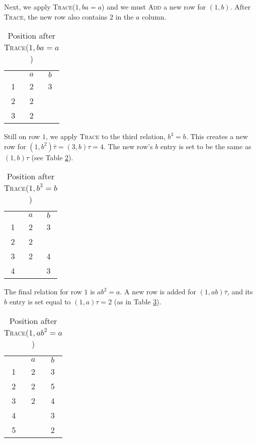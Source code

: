 Next, we apply \textsc{Trace}($1, ba=a$) and we must \textsc{Add} a new row for
$(1, b)$.  After \textsc{Trace}, the new row also contains $2$ in the $a$
column.
\begin{table}[H]
  \centering
  \begin{tabular}{c | c | c |}
    \multicolumn{1}{c}{} &
    \multicolumn{1}{c}{$a$} &
    \multicolumn{1}{c}{$b$} \\
    \cline{2-3}
    1 & 2 & 3 \\
    \cline{2-3}
    2 & 2 & \\
    \cline{2-3}
    3 & 2 & \\
    \cline{2-3}
  \end{tabular}
  \caption{Position after \textsc{Trace}($1, ba=a$)}
  \label{tab:tc3}
\end{table}

Still on row $1$, we apply \textsc{Trace} to the third relation, $b^3=b$.  This
creates a new row for $(1, b^2)\bar\tau = (3, b)\tau = 4$.  The new row's $b$
entry is set to be the same as $(1, b)\tau$ (see Table \ref{tab:tc4}).
\begin{table}[H]
  \centering
  \begin{tabular}{c | c | c |}
    \multicolumn{1}{c}{} &
    \multicolumn{1}{c}{$a$} &
    \multicolumn{1}{c}{$b$} \\
    \cline{2-3}
    1 & 2 & 3 \\
    \cline{2-3}
    2 & 2 & \\
    \cline{2-3}
    3 & 2 & 4 \\
    \cline{2-3}
    4 &  & 3 \\
    \cline{2-3}
  \end{tabular}
  \caption{Position after \textsc{Trace}($1, b^3=b$)}
  \label{tab:tc4}
\end{table}

The final relation for row $1$ is $ab^2=a$.
A new row is added for $(1, ab)\bar\tau$, and its $b$ entry is set equal to
$(1, a)\tau = 2$ (as in Table \ref{tab:tc5}).
\begin{table}[H]
  \centering
  \begin{tabular}{c | c | c |}
    \multicolumn{1}{c}{} &
    \multicolumn{1}{c}{$a$} &
    \multicolumn{1}{c}{$b$} \\
    \cline{2-3}
    1 & 2 & 3 \\
    \cline{2-3}
    2 & 2 & 5 \\
    \cline{2-3}
    3 & 2 & 4 \\
    \cline{2-3}
    4 &  & 3 \\
    \cline{2-3}
    5 & & 2 \\
    \cline{2-3}
  \end{tabular}
  \caption{Position after \textsc{Trace}($1, ab^2=a$)}
  \label{tab:tc5}
\end{table}

